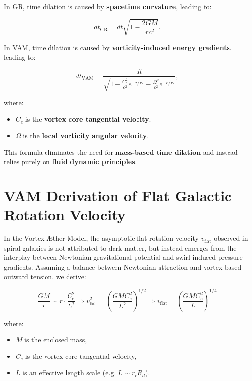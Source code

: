     In GR, time dilation is caused by \textbf{spacetime curvature}, leading to:

    \begin{equation*}
        dt_\text{GR} = dt \sqrt{1 - \frac{2GM}{rc^2}}.
    \end{equation*}

    In VAM, time dilation is caused by \textbf{vorticity-induced energy gradients}, leading to:

    \begin{equation*}
        dt_\text{VAM} = \frac{dt}{\sqrt{1 - \frac{C_e^2}{c^2} e^{-r/r_c} - \frac{\Omega^2}{c^2} e^{-r/r_c}}},
    \end{equation*}

    where:
    \begin{itemize}
        \item  \( C_e \) is the \textbf{vortex core tangential velocity}.
        \item  \( \Omega \) is the \textbf{local vorticity angular velocity}.
    \end{itemize}


    This formula eliminates the need for \textbf{mass-based time dilation} and instead relies purely on \textbf{fluid dynamic principles}.


        \section*{VAM Derivation of Flat Galactic Rotation Velocity}

        In the Vortex \AE{}ther Model, the asymptotic flat rotation velocity $v_{\text{flat}}$ observed in spiral galaxies is not attributed to dark matter, but instead emerges from the interplay between Newtonian gravitational potential and swirl-induced pressure gradients. Assuming a balance between Newtonian attraction and vortex-based outward tension, we derive:

        \[
            \frac{G M}{r} \sim r \cdot \frac{C_e^2}{L^2} \Rightarrow
            v_{\text{flat}}^2 = \left( \frac{G M C_e^2}{L^2} \right)^{1/2} \Rightarrow
            \boxed{v_{\text{flat}} = \left( \frac{G M C_e^2}{L} \right)^{1/4}}
        \]

        where:
        \begin{itemize}
            \item  $M$ is the enclosed mass,
            \item  $C_e$ is the vortex core tangential velocity,
            \item  $L$ is an effective length scale (e.g. $L \sim r_c R_d$).
        \end{itemize}

